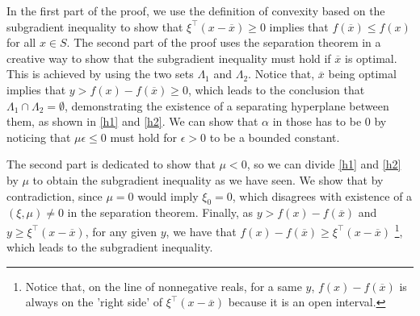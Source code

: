 %
In the first part of the proof, we use the definition of convexity based on the subgradient inequality to show that $\xi^\top(x - \overline{x}) \geq 0$ implies that $f(\overline{x}) \leq f(x)$ for all $x \in S$. The second part of the proof uses the separation theorem in a creative way to show that the subgradient inequality must hold if $\overline{x}$ is optimal. This is achieved by using the two sets $\Lambda_1$ and $\Lambda_2$. Notice that, $\overline{x}$ being optimal implies that $y > f(x) - f(\overline{x}) \geq 0$, which leads to the conclusion that $\Lambda_1 \cap \Lambda_2 = \emptyset$, demonstrating the existence of a separating hyperplane between them, as shown in \eqref{h1} and \eqref{h2}. We can show that $\alpha$ in those has to be $0$ by noticing that $\mu\epsilon \leq 0$ must hold for $\epsilon > 0$ to be a bounded constant.

The second part is dedicated to show that $\mu < 0$, so we can divide \eqref{h1} and \eqref{h2} by $\mu$ to obtain the subgradient inequality as we have seen. We show that by contradiction, since $\mu =0$ would imply $\xi_0 = 0$, which disagrees with existence of a $(\xi, \mu) \neq 0$ in the separation theorem. Finally, as $y > f(x) - f(\overline{x})$ and $y \geq \xi^\top(x - \overline{x})$, for any given $y$, we have that $f(x) - f(\overline{x}) \geq \xi^\top(x - \overline{x})$ \footnote{Notice that, on the line of nonnegative reals, for a same $y$, $f(x) - f(\overline{x})$ is always on the 'right side' of $\xi^\top(x - \overline{x})$ because it is an open interval.}, which leads to the subgradient inequality. 


